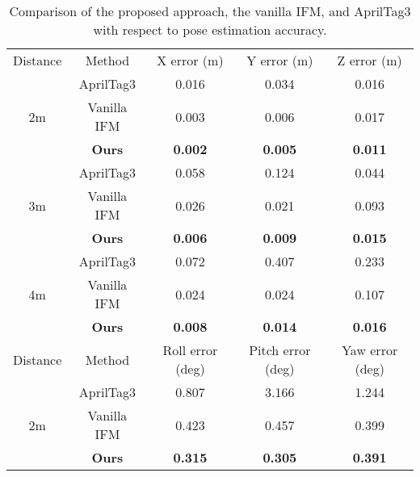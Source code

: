 \begin{table}[H]
\begin{center}
\caption{Comparison of the proposed approach, the vanilla IFM, and AprilTag3 \cite{ap3} with respect to pose estimation accuracy.}
\begin{tabular}{c|c|c|c|c}
\hline \hline
 Distance& Method & X error (m) & Y error (m) &Z error (m) \\
\cline{1-5} 
\multirow{3}{*}{ 2m} & AprilTag3 \cite{ap3} & 0.016 & 0.034 &0.016 \\ \cline{2-5} 
& Vanilla IFM & 0.003 & 0.006 &0.017 \\ \cline{2-5} 
& \textbf{Ours} &\textbf{ 0.002} &\textbf{ 0.005}  &\textbf{0.011} \\ \cline{1-5}

\multirow{3}{*}{3m} & AprilTag3 \cite{ap3} & 0.058 & 0.124 &0.044 \\ \cline{2-5} 
& Vanilla IFM & 0.026  & 0.021 &0.093 \\ \cline{2-5} 
& \textbf{Ours} &\textbf{ 0.006} &\textbf{ 0.009} &\textbf{0.015} \\ \cline{1-5}

\multirow{3}{*}{ 4m} & AprilTag3 \cite{ap3} & 0.072 & 0.407 &0.233 \\ \cline{2-5} 
& Vanilla IFM & 0.024 & 0.024 &0.107 \\ \cline{2-5} 
& \textbf{Ours} &\textbf{ 0.008} & \textbf{0.014} &\textbf{0.016} \\ \cline{1-5}

Distance& Method & Roll error (deg)&  Pitch error (deg) & Yaw error (deg) \\ \hline
\multirow{3}{*}{ 2m} & AprilTag3 \cite{ap3} & 0.807&  3.166 &  1.244 \\ \cline{2-5} 
& Vanilla IFM & 0.423&  0.457 &  0.399 \\ \cline{2-5} 
& \textbf{Ours} &\textbf{ 0.315}&  \textbf{0.305} & \textbf{ 0.391} \\ \cline{1-5}


\end{tabular}
\end{center}
\end{table}
